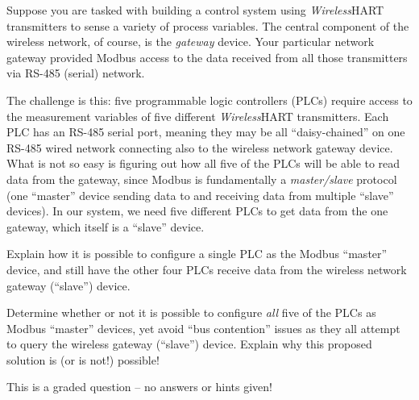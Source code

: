 

Suppose you are tasked with building a control system using {\sl Wireless}HART transmitters to sense a variety of process variables.  The central component of the wireless network, of course, is the {\it gateway} device.  Your particular network gateway provided Modbus access to the data received from all those transmitters via RS-485 (serial) network.

The challenge is this: five programmable logic controllers (PLCs) require access to the measurement variables of five different {\sl Wireless}HART transmitters.  Each PLC has an RS-485 serial port, meaning they may be all ``daisy-chained'' on one RS-485 wired network connecting also to the wireless network gateway device.  What is not so easy is figuring out how all five of the PLCs will be able to read data from the gateway, since Modbus is fundamentally a {\it master/slave} protocol (one ``master'' device sending data to and receiving data from multiple ``slave'' devices).  In our system, we need five different PLCs to get data from the one gateway, which itself is a ``slave'' device.

\vskip 30pt

Explain how it is possible to configure a single PLC as the Modbus ``master'' device, and still have the other four PLCs receive data from the wireless network gateway (``slave'') device.

\vskip 100pt

Determine whether or not it is possible to configure {\it all} five of the PLCs as Modbus ``master'' devices, yet avoid ``bus contention'' issues as they all attempt to query the wireless gateway (``slave'') device.  Explain why this proposed solution is (or is not!) possible!

\vfil 

\eject






This is a graded question -- no answers or hints given!
 






